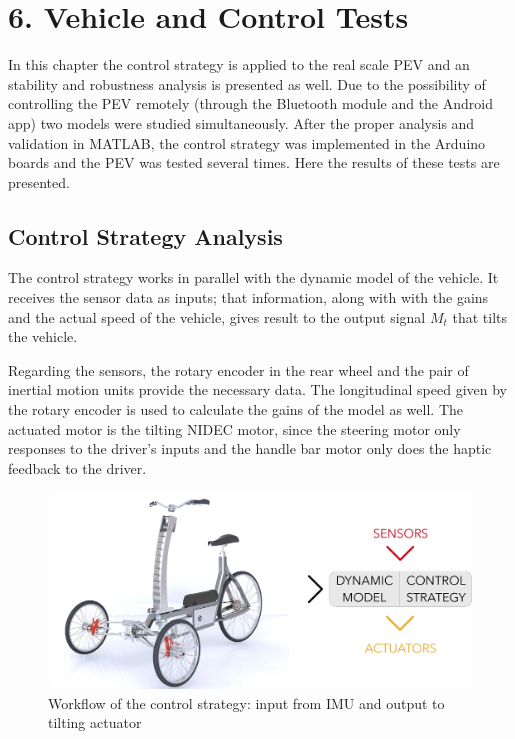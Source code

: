 \chapter{6. Vehicle and Control Tests}

In this chapter the control strategy is applied to the real scale PEV and an stability and robustness analysis is presented as well. Due to the possibility of controlling the PEV remotely (through the Bluetooth module and the Android app) two models were studied simultaneously. After the proper analysis and validation in MATLAB, the control strategy was implemented in the Arduino boards and the PEV was tested several times. Here the results of these tests are presented.

\section{Control Strategy Analysis}

The control strategy works in parallel with the dynamic model of the vehicle. It receives the sensor data as inputs; that information, along with with the gains and the actual speed of the vehicle, gives result to the output signal $M_{t}$ that tilts the vehicle.

Regarding the sensors, the rotary encoder in the rear wheel and the pair of inertial motion units provide the necessary data. The longitudinal speed given by the rotary encoder is used to calculate the gains of the model as well. The actuated motor is the tilting NIDEC motor, since the steering motor only responses to the driver's inputs and the handle bar motor only does the haptic feedback to the driver.

\begin{figure}[!h]
	\includegraphics[width=1\linewidth]{figs/06/strategy3}
	\caption{Workflow of the control strategy: input from IMU and output to tilting actuator}
	\label{strategy}
\end{figure}


